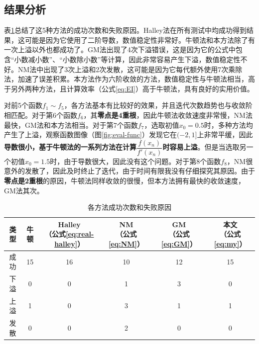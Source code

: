 \subsection{结果分析}


表\ref{tab:exp-summary}总结了这5种方法的成功次数和失败原因。Halley法在所有测试中均成功得到结果，这可能是因为它使用了二阶导数，数值稳定性非常好。牛顿法和本方法除了有一次上溢以外也都成功了。GM法出现了4次下溢错误，这是因为它的公式中包含“小数减小数”、“小数除小数”等计算，因此非常容易产生下溢，数值稳定性不好。NM法中出现了3次上溢和2次发散，这可能是因为它每代额外使用7次乘除法，加速了误差积累。本方法作为六阶收敛的方法，数值稳定性与牛顿法相当，高于另外两种方法，且计算效率（公式\ref{eq:EI}）高于牛顿法，具有良好的实用价值。

对前5个函数$f_1\sim f_5$，各方法基本有比较好的效果，并且迭代次数趋势也与收敛阶相匹配。对于第6个函数$f_6$，其\textbf{零点是4重根}，因此牛顿法收敛速度非常慢，NM法最快，GM法和本方法相当。对于第7个函数$f_7$，选取初值$x_0=0.5$时，多种方法均产生了上溢，观察函数图像（图\ref{fig:eval-func}）发现它在$(-2, 1]$上非常平缓，因此\textbf{导数很小，基于牛顿法的一系列方法在计算$\dfrac{f(x_n)}{f'(x_n)}$时容易上溢}。但是当选取另一个初值$x_0=1.5$时，由于导数很大，因此没有这个问题。对于第8个函数$f_8$，NM很意外的发散了，因此及时终止了迭代，由于时间有限我没有仔细探究其原因。由于\textbf{零点是2重根}的原因，牛顿法同样收敛的很慢，但本方法拥有最快的收敛速度，GM法其次。



\begin{table}[!htbp]
    \centering
    \caption{各方法成功次数和失败原因}
    \label{tab:exp-summary}
    \begin{tabular}{c|ccccc}
        \toprule
        类型 & 牛顿 & \makecell[c]{Halley\\（公式\ref{eq:real-halley}）} & \makecell[c]{NM\cite{neta1979sixth}\\（公式\ref{eq:NM}）} & \makecell[c]{GM\cite{grau2006improvement}\\（公式\ref{eq:GM}）} & \makecell[c]{本文\\（公式\ref{eq:my}）} \\
        \midrule
        成功 & 15 & 16 & 10 & 12 & 15 \\
        下溢 & 0  & 0  & 1  & 3  & 0 \\
        上溢 & 1  & 0  & 3  & 1  & 1 \\
        发散 & 0  & 0  & 2  & 0  & 0 \\
        \bottomrule
    \end{tabular}
\end{table}



